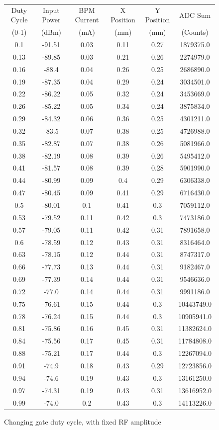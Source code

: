 \documentclass[a4paper, 11pt]{article}%
\begin{document}
%
\begin{figure}[htbp]%
\centering%
\caption{Changing gate duty cycle, with fixed RF amplitude }%
\begin{tabular}{|c|c|c|c|c|c|}%
\hline%
Duty Cycle&Input Power&BPM Current&X Position&Y Position&ADC Sum\\%
(0{-}1)&(dBm)&(mA)&(mm)&(mm)&(Counts)\\%
\hline%
0.1&{-}91.51&0.03&0.11&0.27&1879375.0\\%
0.13&{-}89.85&0.03&0.21&0.26&2274979.0\\%
0.16&{-}88.4&0.04&0.26&0.25&2686890.0\\%
0.19&{-}87.35&0.04&0.29&0.24&3034501.0\\%
0.22&{-}86.22&0.05&0.32&0.24&3453669.0\\%
0.26&{-}85.22&0.05&0.34&0.24&3875834.0\\%
0.29&{-}84.32&0.06&0.36&0.25&4301211.0\\%
0.32&{-}83.5&0.07&0.38&0.25&4726988.0\\%
0.35&{-}82.87&0.07&0.38&0.26&5081966.0\\%
0.38&{-}82.19&0.08&0.39&0.26&5495412.0\\%
0.41&{-}81.57&0.08&0.39&0.28&5901990.0\\%
0.44&{-}80.99&0.09&0.4&0.29&6306338.0\\%
0.47&{-}80.45&0.09&0.41&0.29&6716430.0\\%
0.5&{-}80.01&0.1&0.41&0.3&7059112.0\\%
0.53&{-}79.52&0.11&0.42&0.3&7473186.0\\%
0.57&{-}79.05&0.11&0.42&0.31&7891658.0\\%
0.6&{-}78.59&0.12&0.43&0.31&8316464.0\\%
0.63&{-}78.15&0.12&0.44&0.31&8747317.0\\%
0.66&{-}77.73&0.13&0.44&0.31&9182467.0\\%
0.69&{-}77.39&0.14&0.44&0.31&9546636.0\\%
0.72&{-}77.0&0.14&0.44&0.31&9991186.0\\%
0.75&{-}76.61&0.15&0.44&0.3&10443749.0\\%
0.78&{-}76.24&0.15&0.44&0.3&10905941.0\\%
0.81&{-}75.86&0.16&0.45&0.31&11382624.0\\%
0.84&{-}75.56&0.17&0.45&0.31&11784808.0\\%
0.88&{-}75.21&0.17&0.44&0.3&12267094.0\\%
0.91&{-}74.9&0.18&0.43&0.29&12723856.0\\%
0.94&{-}74.6&0.19&0.43&0.3&13161250.0\\%
0.97&{-}74.31&0.19&0.43&0.31&13616952.0\\%
0.99&{-}74.0&0.2&0.43&0.3&14113226.0\\%
\hline%
\end{tabular}%
\end{figure}%
\end{document}
